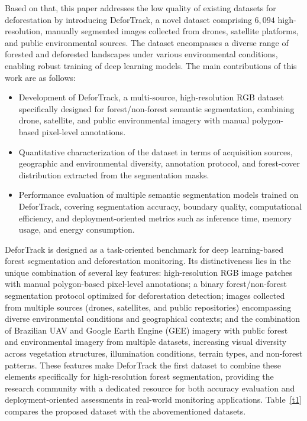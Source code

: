 \documentclass[journal,article,submit,pdftex,moreauthors]{Definitions/mdpi}
\begin{document}
Based on that, this paper addresses the low quality of existing datasets for deforestation by introducing DeforTrack, a novel dataset comprising $6,094$ high-resolution, manually segmented images collected from drones, satellite platforms, and public environmental sources. The dataset encompasses a diverse range of forested and deforested landscapes under various environmental conditions, enabling robust training of deep learning models. The main contributions of this work are as follows:

\begin{itemize}
    \item Development of DeforTrack, a multi-source, high-resolution RGB dataset specifically designed for forest/non-forest semantic segmentation, combining drone, satellite, and public environmental imagery with manual polygon-based pixel-level annotations.
    
    \item Quantitative characterization of the dataset in terms of acquisition sources, geographic and environmental diversity, annotation protocol, and forest-cover distribution extracted from the segmentation masks.
    
    \item Performance evaluation of multiple semantic segmentation models trained on DeforTrack, covering segmentation accuracy, boundary quality, computational efficiency, and deployment-oriented metrics such as inference time, memory usage, and energy consumption.
\end{itemize}

DeforTrack is designed as a task-oriented benchmark for deep learning-based forest segmentation and deforestation monitoring. Its distinctiveness lies in the unique combination of several key features: high-resolution RGB image patches with manual polygon-based pixel-level annotations; a binary forest/non-forest segmentation protocol optimized for deforestation detection; images collected from multiple sources (drones, satellites, and public repositories) encompassing diverse environmental conditions and geographical contexts; and the combination of Brazilian UAV and Google Earth Engine (GEE) imagery with public forest and environmental imagery from multiple datasets, increasing visual diversity across vegetation structures, illumination conditions, terrain types, and non-forest
patterns. These features make DeforTrack the first dataset to combine these elements specifically for high-resolution forest segmentation, providing the research community with a dedicated resource for both accuracy evaluation and deployment-oriented assessments in real-world monitoring applications. Table~\ref{t1} compares the proposed dataset with the abovementioned datasets. 
\end{document}
